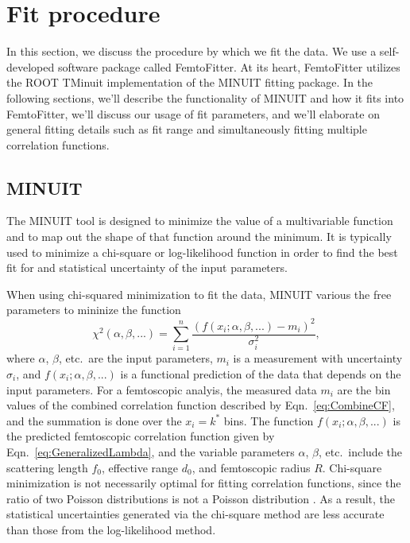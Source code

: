 \section{Fit procedure}
\label{sec:FitProcedure}

In this section, we discuss the procedure by which we fit the data.
We use a self-developed software package called FemtoFitter.
At its heart, FemtoFitter utilizes the ROOT TMinuit implementation of the MINUIT \cite{James:2004xla} fitting package.
In the following sections, we'll describe the functionality of MINUIT and how it fits into FemtoFitter, we'll discuss our usage of fit parameters, and we'll elaborate on general fitting details such as fit range and simultaneously fitting multiple correlation functions.


\subsection{MINUIT}
\label{sec:MINUIT}
The MINUIT tool is designed to minimize the value of a multivariable function and to map out the shape of that function around the minimum.
It is typically used to minimize a chi-square or log-likelihood function in order to find the best fit for and statistical uncertainty of the input parameters.

When using chi-squared minimization to fit the data, MINUIT various the free parameters to mininize the function
\begin{equation}
\label{eq:Chisquare}
\chi^2(\alpha, \beta, ...) = \sum_{i=1}^{n} \frac{(f(x_i; \alpha, \beta, ...)-m_i)^2}{\sigma^2_i},
\end{equation}
where $\alpha$, $\beta$, etc.\ are the input parameters, $m_i$ is a measurement with uncertainty $\sigma_i$, and $f(x_i; \alpha, \beta, ...)$ is a functional prediction of the data that depends on the input parameters.
For a femtoscopic analyis, the measured data $m_i$ are the bin values of the combined correlation function described by Eqn.\ \ref{eq:CombineCF}, and the summation is done over the $x_i = k^*$ bins.
The function $f(x_i; \alpha, \beta, ...)$ is the  predicted femtoscopic correlation function given by Eqn.\ \ref{eq:GeneralizedLambda}, and the variable parameters $\alpha$, $\beta$, etc.\ include the scattering length $f_0$, effective range $d_0$, and femtoscopic radius $R$.
Chi-square minimization is not necessarily optimal for fitting correlation functions, since the ratio of two Poisson distributions is not a Poisson distribution \cite{Lisa:2005dd}.
As a result, the statistical uncertainties generated via the chi-square method are less accurate than those from the log-likelihood method.

